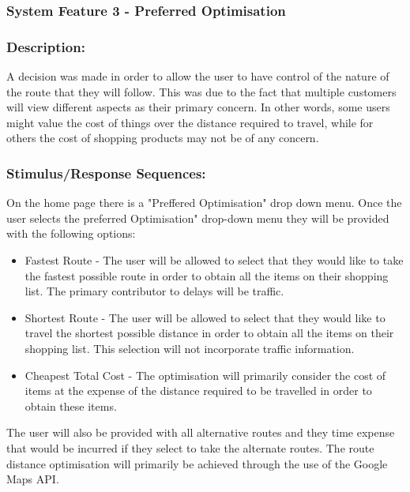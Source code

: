 \documentclass[10pt,twocolumn]{witseiepaper}
\begin{document}
		\subsubsection{System Feature 3 - Preferred Optimisation}
		
		\subsubsection*{Description:}
		
		A decision was made in order to allow the user to have control of the nature of the route that they will follow. This was due to the fact that multiple customers will view different aspects as their primary concern. In other words, some users might value the cost of things over the distance required to travel, while for others the cost of shopping products may not be of any concern. 
		
		\subsubsection*{Stimulus/Response Sequences:}
		
		On the home page there is a "Preffered Optimisation" drop down menu. Once the user selects the preferred Optimisation" drop-down menu they will be provided with the following options:
		
		\begin{itemize}
			\item Fastest Route - The user will be allowed to select that they would like to take the fastest possible route in order to obtain all the items on their shopping list. The primary contributor to delays will be traffic.
			\item Shortest Route - The user will be allowed to select that they would like to travel the shortest possible distance in order to obtain all the items on their shopping list. This selection will not incorporate traffic information.
			\item Cheapest Total Cost - The optimisation will primarily consider the cost of items at the expense of the distance required to be travelled in order to obtain these items. 
		\end{itemize}
		
		The user will also be provided with all alternative routes and they time expense that would be incurred if they select to take the alternate routes. The route distance optimisation will primarily be achieved through the use of the Google Maps API.
		
\end{document}
